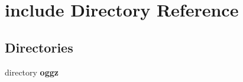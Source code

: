 \section{include Directory Reference}
\label{dir_d44c64559bbebec7f509842c48db8b23}
\subsection*{Directories}
\begin{DoxyCompactItemize}
\item 
directory {\bf oggz}
\end{DoxyCompactItemize}
